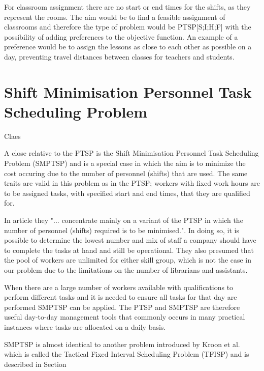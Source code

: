 For classroom assignment there are no start or end times for the shifts, as they represent the rooms. The aim would be to find a feasible assignment of classrooms and therefore the type of problem would be PTSP[S;I;H;F] with the possibility of adding preferences to the objective function. An example of a preference would be to assign the lessons as close to each other as possible on a day, preventing travel distances between classes for teachers and students.



%
%

\section{Shift Minimisation Personnel Task Scheduling Problem}\label{SMTSP}
Claes

A close relative to the PTSP is the Shift Minimisation Personnel Task Scheduling Problem (SMPTSP) and is a special case in which the aim is to minimize the cost occuring due to the number of personnel (shifts) that are used. The same traits are valid in this problem as in the PTSP; workers with fixed work hours are to be assigned tasks, with specified start and end times, that they are qualified for.

In article \cite{krishnamoorthy_2011} they "... concentrate mainly on a variant of the PTSP in which the number of personnel (shifts) required is to be minimised.". In doing so, it is possible to determine the lowest number and mix of staff a company should have to complete the tasks at hand and still be operational. They also presumed that the pool of workers are unlimited for either skill group, which is not the case in our problem due to the limitations on the number of librarians and assistants. 

When there are a large number of workers available with qualifications to perform different tasks and it is needed to ensure all tasks for that day are performed SMPTSP can be applied. The PTSP and SMPTSP are therefore useful day-to-day management tools that commonly occurs in many practical instances where tasks are allocated on a daily basis.

SMPTSP is almost identical to another problem introduced by Kroon et al. \cite{kroon_1997} which is called the Tactical Fixed Interval Scheduling Problem (TFISP) and is described in Section %

